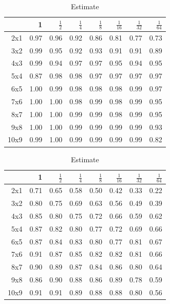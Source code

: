 \documentclass[conference]{IEEEtran}
\begin{document}
\begin{table}
\begin{minipage}{.33\linewidth}
  \end{minipage}
  \begin{minipage}{.33\linewidth}
  \centering
{\small
\begin{tabular}{rrrrrrrr}
  \hline
 & 1 & $\frac{1}{2}$ & $\frac{1}{4}$ & $\frac{1}{8}$ & $\frac{1}{16}$ & $\frac{1}{32}$ & $\frac{1}{64}$ \\ 
  \hline
2x1 & 0.97 & 0.96 & 0.92 & 0.86 & 0.81 & 0.77 & 0.73 \\ 
  3x2 & 0.99 & 0.95 & 0.92 & 0.93 & 0.91 & 0.91 & 0.89 \\ 
  4x3 & 0.99 & 0.94 & 0.97 & 0.97 & 0.95 & 0.94 & 0.95 \\ 
  5x4 & 0.87 & 0.98 & 0.98 & 0.97 & 0.97 & 0.97 & 0.97 \\ 
  6x5 & 1.00 & 0.99 & 0.98 & 0.98 & 0.98 & 0.99 & 0.97 \\ 
  7x6 & 1.00 & 1.00 & 0.98 & 0.99 & 0.98 & 0.99 & 0.95 \\ 
  8x7 & 1.00 & 1.00 & 0.99 & 0.99 & 0.98 & 0.99 & 0.95 \\ 
  9x8 & 1.00 & 1.00 & 0.99 & 0.99 & 0.99 & 0.99 & 0.93 \\ 
  10x9 & 0.99 & 1.00 & 0.99 & 0.99 & 0.99 & 0.99 & 0.82 \\ 
   \hline
\end{tabular}
}


  \end{minipage}
\caption*{Estimate}
  \begin{minipage}{.33\linewidth}
  \centering
{\small
\begin{tabular}{rrrrrrrr}
  \hline
 & 1 & $\frac{1}{2}$ & $\frac{1}{4}$ & $\frac{1}{8}$ & $\frac{1}{16}$ & $\frac{1}{32}$ & $\frac{1}{64}$ \\ 
  \hline
2x1 & 0.71 & 0.65 & 0.58 & 0.50 & 0.42 & 0.33 & 0.22 \\ 
  3x2 & 0.80 & 0.75 & 0.69 & 0.63 & 0.56 & 0.49 & 0.39 \\ 
  4x3 & 0.85 & 0.80 & 0.75 & 0.72 & 0.66 & 0.59 & 0.62 \\ 
  5x4 & 0.87 & 0.82 & 0.80 & 0.77 & 0.72 & 0.69 & 0.66 \\ 
  6x5 & 0.87 & 0.84 & 0.83 & 0.80 & 0.77 & 0.81 & 0.67 \\ 
  7x6 & 0.91 & 0.87 & 0.85 & 0.82 & 0.82 & 0.81 & 0.66 \\ 
  8x7 & 0.90 & 0.89 & 0.87 & 0.84 & 0.86 & 0.80 & 0.64 \\ 
  9x8 & 0.86 & 0.90 & 0.88 & 0.86 & 0.89 & 0.78 & 0.59 \\ 
  10x9 & 0.91 & 0.91 & 0.89 & 0.88 & 0.88 & 0.80 & 0.56 \\ 
   \hline
\end{tabular}
}



\end{minipage}
\end{table}
\end{document}
